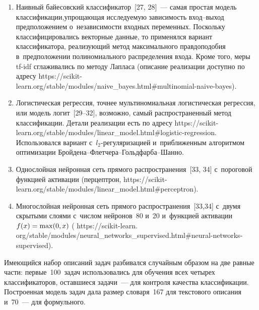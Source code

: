 \begin{multicols}{2}
\begin{enumerate}[1.]
\item Наивный байесовский классификатор~[27, 28]~--- самая прос\-тая модель 
классификации,\linebreak упро\-ща\-ющая ис\-сле\-ду\-емую за\-ви\-си\-мость вход--вы\-ход 
предположением о~не\-за\-ви\-си\-мости входных переменных. Поскольку 
классифицировались векторные данные, то применялся \mbox{вариант} 
классификатора, реализующий метод максимального правдоподобия в~предположении полиномиального распределения входа. Кроме того, меры 
 tf-idf сглаживались по методу Лапласа (описание реализации доступно по 
адресу {\sf https://scikit-learn.org/stable/modules/\linebreak naive\_bayes.html\#multinomial-naive-bayes)}.
\item Логистическая регрессия, точ\-нее мультиномиальная логистическая 
регрессия, или модель логит~[29--32], возможно, самый распространенный 
метод классификации. Детали реализации есть по адресу {\sf  
https://scikit-learn.org/stable/\linebreak modules/linear\_model.html\#logistic-regression}. 
Использовался вариант с~$l_2$-ре\-гу\-ля\-ри\-за\-ци\-ей и~приближенным алгоритмом 
оптимизации Брой\-де\-на--Флет\-че\-ра--Гольд\-фар\-ба--Шанно.
\item Однослойная нейронная сеть прямого распространения~[33, 34] 
с~пороговой функцией активации (перцептрон, {\sf  
https://scikit-learn.org/\linebreak stable/modules/linear\_model.html\#perceptron}).
\item Многослойная нейронная сеть прямого распространения~[33,34] 
с~двумя скрытыми слоями с~чис\-лом нейронов~80 и~20 и~функцией\linebreak 
активации $f(x)\hm= \max(0,x)$ ({\sf  
https://scikit-learn. org/stable/modules/neural\_networks\_supervised.\linebreak html\#neural-networks-supervised}).
\end{enumerate}

     Имеющийся набор описаний задач разбивался случайным образом на 
две равные час\-ти: первые~100~задач использовались для обуче\-ния всех 
четырех классификаторов, остав\-ши\-еся задачи~--- для контроля качества 
классификации. По\-стро\-ен\-ная модель задач дала раз\-мер словаря~167 для 
текс\-то\-во\-го описания и~70~--- для формульного.
     

\end{multicols}

